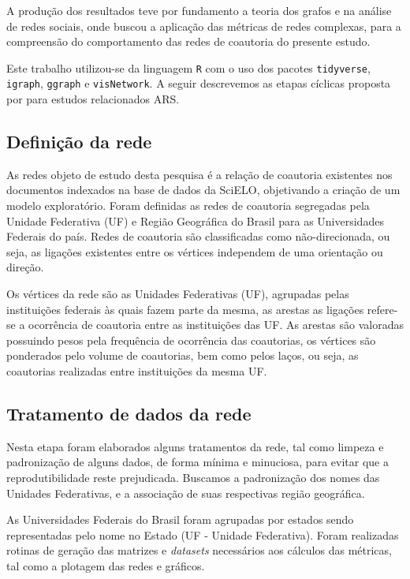 \documentclass[12pt]{article}
\begin{document}
A produção dos resultados teve por fundamento a teoria dos grafos e na análise de redes sociais, onde buscou a aplicação das métricas de redes complexas, para a compreensão do comportamento das redes de coautoria do presente estudo.

Este trabalho utilizou-se da linguagem \texttt R com o uso dos pacotes \texttt{tidyverse}, \texttt{igraph}, \texttt{ggraph} e \texttt{visNetwork}. A seguir descrevemos as etapas cíclicas proposta por \cite{de2018exploratory} para estudos relacionados ARS.

\subsection{Definição da rede}

As redes objeto de estudo desta pesquisa é a relação de coautoria existentes nos documentos indexados na base de dados da SciELO, objetivando a criação de um modelo exploratório. Foram definidas as redes de coautoria segregadas pela Unidade Federativa (UF) e Região Geográfica do Brasil para as Universidades Federais do país. Redes de coautoria são classificadas como não-direcionada, ou seja, as ligações existentes entre os vértices independem de uma orientação ou direção.

Os vértices da rede são as Unidades Federativas (UF), agrupadas pelas instituições federais às quais fazem parte da mesma, as arestas as ligações refere-se a ocorrência de coautoria entre as instituições das UF. As arestas são valoradas possuindo pesos pela frequência de ocorrência das coautorias, os vértices são ponderados pelo volume de coautorias, bem como pelos laços, ou seja, as coautorias realizadas entre instituições da mesma UF. %


\subsection{Tratamento de dados da rede}

Nesta etapa foram elaborados alguns tratamentos da rede, tal como limpeza e padronização de alguns dados, de forma mínima e minuciosa, para evitar que a reprodutibilidade reste prejudicada. Buscamos a padronização dos nomes das Unidades Federativas, e a associação de suas respectivas região geográfica.

As Universidades Federais do Brasil foram agrupadas por estados sendo representadas pelo nome no Estado (UF - Unidade Federativa). Foram realizadas rotinas de geração das matrizes e \textit{datasets} necessários aos cálculos das métricas, tal como a plotagem das redes e gráficos.
\end{document}
